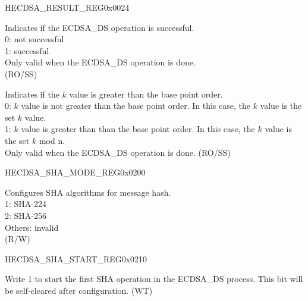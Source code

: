 \begin{register}{H}{ECDSA\_RESULT\_REG}{0x0024}\label{regdesc:ECDSARESULTREG}
%
%
%
\regnewline%
\begin{regdesc}\begin{reglist}
\label{fielddesc:ECDSAOPERATIONRESULT}\item [ECDSA\_OPERATION\_RESULT] Indicates if the ECDSA\_DS operation is successful.\\
0: not successful\\
1: successful\\
Only valid when the ECDSA\_DS operation is done.\\
(RO/SS)
\label{fielddesc:ECDSAKVALUEWARNING}\item [ECDSA\_K\_VALUE\_WARNING] Indicates if the $k$ value is greater than the base point order.\\
0: $k$ value is not greater than the base point order. In this case, the $k$ value is the set $k$ value.\\
1: $k$ value is greater than than the base point order. In this case, the $k$ value is the set $k$ mod n.\\
Only valid when the ECDSA\_DS operation is done. (RO/SS)
\end{reglist}\end{regdesc}
\end{register}


\begin{register}{H}{ECDSA\_SHA\_MODE\_REG}{0x0200}\label{regdesc:ECDSASHAMODEREG}
%
%
\regnewline%
\begin{regdesc}\begin{reglist}
\label{fielddesc:ECDSASHAMODE}\item [ECDSA\_SHA\_MODE] Configures SHA algorithms for message hash. \\
1: SHA-224\\
2: SHA-256\\
Others: invalid\\
(R/W)
\end{reglist}\end{regdesc}
\end{register}


\begin{register}{H}{ECDSA\_SHA\_START\_REG}{0x0210}\label{regdesc:ECDSASHASTARTREG}
%
%
\regnewline%
\begin{regdesc}\begin{reglist}
\label{fielddesc:ECDSASHASTART}\item [ECDSA\_SHA\_START] Write 1 to start the first SHA operation in the ECDSA\_DS process. This bit will be self-cleared after configuration. (WT)
\end{reglist}\end{regdesc}
\end{register}


